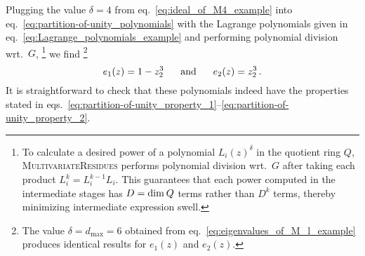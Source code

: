 \documentclass[dvipsnames,preprint,12pt,sort&compress]{elsarticle}
\begin{document}
Plugging the value $\delta=4$ from eq.~\eqref{eq:ideal_of_M4_example} into
eq.~\eqref{eq:partition-of-unity_polynomials}
with the Lagrange polynomials given in eq.~\eqref{eq:Lagrange_polynomials_example}
and performing polynomial division wrt.~$G$,%
\footnote{To calculate a desired power of a polynomial $L_i(z)^\delta$ in the quotient ring $Q$,
\textsc{MultivariateResidues} performs polynomial division wrt.~$G$ after
taking each product $L_i^k = L_i^{k-1} L_i$. This guarantees that each power computed
in the intermediate stages has $D = \mathrm{dim} \hspace{0.7mm} Q$ terms
rather than $D^k$ terms, thereby minimizing intermediate expression swell.} we find%
\footnote{The value $\delta=d_\mathrm{max}=6$ obtained from eq.~\eqref{eq:eigenvalues_of_M_l_example}
produces identical results for $e_1(z)$ and $e_2(z)$.}
\begin{equation}
e_1(z) = 1 - z_2^3 \hspace{6mm} \mathrm{and} \hspace{6mm} e_2(z) = z_2^3 \,.
\label{eq:partition-of-unity_polynomials_example}
\end{equation}
It is straightforward to check that these polynomials indeed have the
properties stated in eqs.~\eqref{eq:partition-of-unity_property_1}--\eqref{eq:partition-of-unity_property_2}.
\end{document}
